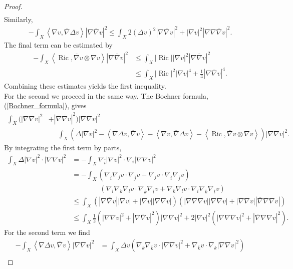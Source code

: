 \documentclass[12pt]{article}
\numberwithin{equation}{section}
\DeclareMathOperator{\Ric}{Ric}
\newcommand{\oo}[1]{\overline{#1}}
\newcommand{\ip}[1]{\left\langle#1\right\rangle}
\begin{document}
\begin{proof}
{\begin{align*}
\end{align*}
}
Similarly,
\begin{align*}
    -\int_X \ip{\nabla v, \oo{\nabla} \Delta v} |\nabla \oo{\nabla} v|^2 \leq \int_X 2(\Delta v)^2 |\nabla \oo{\nabla} v|^2 + |\nabla v|^2 |\nabla\nabla \oo{\nabla} v|^2.
\end{align*}
The final term can be estimated by
\begin{align*}
    -\int_X \ip{\Ric, \oo{\nabla} v \otimes \nabla v} |\nabla \oo{\nabla} v|^2 &\leq \int_X |\Ric| |\nabla v|^2 |\nabla \oo{\nabla} v|^2\\
    &\leq \int_X |\Ric|^2|\nabla v|^4 + \frac{1}{4} |\nabla \oo{\nabla} v|^4.
\end{align*}
Combining these estimates yields the first inequality.\\
For the second we proceed in the same way. The Bochner formula, (\ref{Bochner_formula}), gives
\begin{align*}
    \int_X (|\nabla \nabla v|^2 &+ |\nabla \oo{\nabla} v|^2) |\nabla \nabla v|^2\\
    &= \int_X (\Delta |\nabla v|^2 - \ip{\nabla \Delta v, \oo{\nabla} v} - \ip{\nabla v, \oo{\nabla} \Delta v} - \ip{\Ric, \oo{\nabla} v\otimes \nabla v}) |\nabla \nabla v|^2.
\end{align*}
By integrating the first term by parts,
\begin{align*}
    \int_X \Delta |\nabla v|^2 \cdot |\nabla \nabla v|^2 &= -\int_X \nabla_{\oo{i}} |\nabla v|^2 \cdot \nabla_i|\nabla \nabla v|^2\\
    &= - \int_X (\nabla_{\oo{i}} \nabla_j v \cdot \nabla_{\oo{j}} v + \nabla_j v \cdot \nabla_{\oo{i}} \nabla_{\oo{j}} v)\\
    &\quad\quad\quad\quad (\nabla_i \nabla_k \nabla_l v\cdot \nabla_{\oo{k}}\nabla_{\oo{l}} v + \nabla_k \nabla_l v \cdot \nabla_i \nabla_{\oo{k}} \nabla_{\oo{l}} v)\\
    &\leq \int_X (|\nabla \oo{\nabla} v||\nabla v| + |\nabla v||\nabla \nabla v|)(|\nabla \nabla \nabla v| |\nabla\nabla v| + |\nabla \nabla v| |\oo{\nabla} \nabla \nabla v|)\\
    &\leq \int_X \frac{1}{2} (|\nabla \nabla v|^2 + |\nabla \oo{\nabla} v|^2)|\nabla \nabla v|^2 + 2|\nabla v|^2 (|\nabla\nabla \nabla v|^2 + |\oo{\nabla} \nabla \nabla v|^2).
\end{align*}
For the second term we find
{\allowdisplaybreaks
\begin{align*}
    -\int_X \ip{\nabla \Delta v, \oo{\nabla} v} |\nabla \nabla v|^2 &= \int_X \Delta v (\nabla_k \nabla_{\oo{k}} v \cdot |\nabla \nabla v|^2 + \nabla_{\oo{k}} v \cdot \nabla_k |\nabla \nabla v|^2)\\

\end{align*}}
\end{proof}
\end{document}
